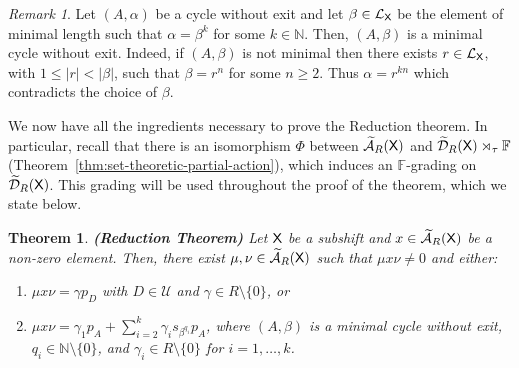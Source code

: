 \documentclass[a4paper,12pt]{amsart}
\newtheorem{theorem}[equation]{Theorem}
\theoremstyle{definition}
\theoremstyle{remark}
\newtheorem{remark}[equation]{Remark}
\numberwithin{equation}{section}
\newcommand{\osf}{{\normalfont \textsf{X}}}
\newcommand{\lang}{\CL_{\osf}}
\newcommand{\ualgshift}{\TCA_R(\osf)}
\newcommand{\udalgshift}{\TCD_R(\osf)}
\newcommand{\N}{\mathbb{N}}
\newcommand{\F}{\mathbb{F}}
\newcommand{\CA}{\mathcal{A}}
\newcommand{\CD}{\mathcal{D}}
\newcommand{\CL}{\mathcal{L}}
\newcommand{\TCA}{\widetilde{\CA}}
\newcommand{\TCB}{\mathcal{U}}
\newcommand{\TCD}{\widetilde{\CD}}
\begin{document}
\begin{remark}\label{minimal cycle} Let $(A,\alpha)$ be a cycle without exit and let $\beta\in \lang$ be the element of minimal length such that $\alpha=\beta^k$ for some $k\in \N$. Then, $(A, \beta)$ is a minimal cycle without exit. Indeed, if $(A,\beta)$ is not minimal then there exists $r\in \lang$, with $1\leq |r|<|\beta|$, such that $\beta=r^n$ for some $n\geq 2$. Thus $\alpha=r^{kn}$ which contradicts the choice of $\beta$.  \end{remark}

We now have all the ingredients necessary to prove the Reduction theorem. In particular, recall that there is an isomorphism $\Phi$ between $\ualgshift$ and $\udalgshift\rtimes_{\tau}\F$ (Theorem~\ref{thm:set-theoretic-partial-action}), which induces an $\F$-grading on $\udalgshift$. This grading will be used throughout the proof of the theorem, which we state below.



\begin{theorem}\label{reduction theorem} {\rm \textbf{(Reduction Theorem)}} Let $\osf$ be a subshift and $x\in \ualgshift$ be a non-zero element. Then, there exist $\mu,\nu\in \ualgshift$ such that  $\mu x\nu\neq 0$ and either:
\begin{enumerate}[\hspace{.3cm} \rm (1)]
    \item $\mu x\nu=\gamma p_D$ with $D\in \TCB$ and $\gamma \in R \setminus \{0\}$, or
    \item $\mu x\nu=\gamma_1 p_A +\sum\limits_{i=2}^k \gamma_i s_{\beta^{q_i}}p_A$, where $(A,\beta)$ is a minimal cycle without exit, $q_i\in \N\setminus \{0\}$, and $\gamma_i\in R \setminus \{0\}$ for $i=1,\ldots, k$.
\end{enumerate}
 

\end{theorem}
\end{document}
